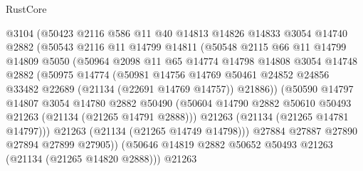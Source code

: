 \begin{lexlean}{RustCore}
\begin{coremodule}
                    @3104
                    (@50423
                      @2116
                      @586
                      @11
                      @40
                      @14813
                      @14826
                      @14833
                      @3054
                      @14740
                      @2882
                      (@50543
                        @2116
                        @11
                        @14799
                        @14811
                        (@50548
                          @2115
                          @66
                          @11
                          @14799
                          @14809
                          @5050
                          (@50964
                            @2098
                            @11
                            @65
                            @14774
                            @14798
                            @14808
                            @3054
                            @14748
                            @2882
                            (@50975
                              @14774
                              (@50981
                                @14756
                                @14769
                                @50461
                                @24852
                                @24856
                                @33482
                                @22689
                                (@21134 (@22691 @14769 @14757))
                                @21886))
                            (@50590
                              @14797
                              @14807
                              @3054
                              @14780
                              @2882
                              @50490
                              (@50604
                                @14790
                                @2882
                                @50610
                                @50493
                                @21263
                                (@21134 (@21265 @14791 @2888)))
                              @21263
                              (@21134 (@21265 @14781 @14797)))
                            @21263
                            (@21134 (@21265 @14749 @14798)))
                          @27884
                          @27887
                          @27890
                          @27894
                          @27899
                          @27905))
                      (@50646 @14819 @2882 @50652 @50493 @21263 (@21134 (@21265 @14820 @2888)))
                      @21263

\end{coremodule}
\end{lexlean}

